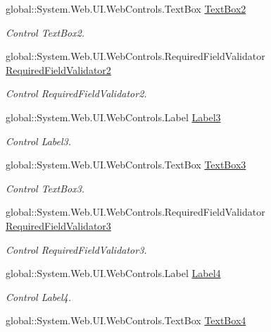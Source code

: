 \begin{DoxyCompactItemize}
global\+::\+System.\+Web.\+U\+I.\+Web\+Controls.\+Text\+Box \mbox{\hyperlink{class_inicio_1_1_cambiar_password_a7eeeb21567b9f20fcb890fbffc4146f4}{Text\+Box2}}
\begin{DoxyCompactList}\small\item\em Control Text\+Box2. \end{DoxyCompactList}\item 
global\+::\+System.\+Web.\+U\+I.\+Web\+Controls.\+Required\+Field\+Validator \mbox{\hyperlink{class_inicio_1_1_cambiar_password_a955b645fae496e6d030ac5da64663fc7}{Required\+Field\+Validator2}}
\begin{DoxyCompactList}\small\item\em Control Required\+Field\+Validator2. \end{DoxyCompactList}\item 
global\+::\+System.\+Web.\+U\+I.\+Web\+Controls.\+Label \mbox{\hyperlink{class_inicio_1_1_cambiar_password_a4aa07cf906d98059cf6158cf3e31800a}{Label3}}
\begin{DoxyCompactList}\small\item\em Control Label3. \end{DoxyCompactList}\item 
global\+::\+System.\+Web.\+U\+I.\+Web\+Controls.\+Text\+Box \mbox{\hyperlink{class_inicio_1_1_cambiar_password_affa43c3fb9f3daacfb67965c2c50466f}{Text\+Box3}}
\begin{DoxyCompactList}\small\item\em Control Text\+Box3. \end{DoxyCompactList}\item 
global\+::\+System.\+Web.\+U\+I.\+Web\+Controls.\+Required\+Field\+Validator \mbox{\hyperlink{class_inicio_1_1_cambiar_password_a618ca28dc9312f747d6f48cc9b11f132}{Required\+Field\+Validator3}}
\begin{DoxyCompactList}\small\item\em Control Required\+Field\+Validator3. \end{DoxyCompactList}\item 
global\+::\+System.\+Web.\+U\+I.\+Web\+Controls.\+Label \mbox{\hyperlink{class_inicio_1_1_cambiar_password_a5c90deffe35773405ff5ec7a875eb035}{Label4}}
\begin{DoxyCompactList}\small\item\em Control Label4. \end{DoxyCompactList}\item 
global\+::\+System.\+Web.\+U\+I.\+Web\+Controls.\+Text\+Box \mbox{\hyperlink{class_inicio_1_1_cambiar_password_a9365f80de4f65ec031a704d80d0b5c51}{Text\+Box4}}

\end{DoxyCompactItemize}
